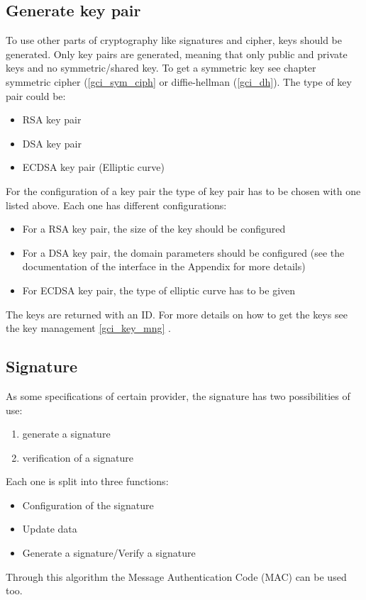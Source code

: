 \subsection{Generate key pair}
\label{gci_gen_key}
To use other parts of cryptography like signatures and cipher, keys
should be generated.\newline
Only key pairs are generated, meaning that only public and private keys and no
symmetric/shared key.\newline
To get a symmetric key see chapter symmetric cipher (\ref{gci_sym_ciph} or
diffie-hellman (\ref{gci_dh}).\newline
The type of key pair could be:
\begin{itemize}
  \item RSA key pair
  \item DSA key pair
  \item ECDSA key pair (Elliptic curve)
\end{itemize}
For the configuration of a key pair the type of key pair has to be chosen with
one listed above.\newline
Each one has different configurations:
\begin{itemize}
  \item For a RSA key pair, the size of the key should be configured
  \item For a DSA key pair, the domain parameters should be configured (see the
  documentation of the interface in the Appendix for more details)
  \item For ECDSA key pair, the type of elliptic curve has to be given
\end{itemize}
The keys are returned with an ID. For more details on how to get the keys see
the key management \ref{gci_key_mng}
.
\newpage
\subsection{Signature}
\label{gci_sign}
As some specifications of certain provider, the signature has two possibilities
of use:
\begin{enumerate}
  \item generate a signature
  \item verification of a signature\newline
\end{enumerate}
Each one is split into three functions:
\begin{itemize}
  \item Configuration of the signature
  \item Update data
  \item Generate a signature/Verify a signature\newline
\end{itemize}
Through this algorithm the Message Authentication Code (MAC) can be used
too.
\newpage
